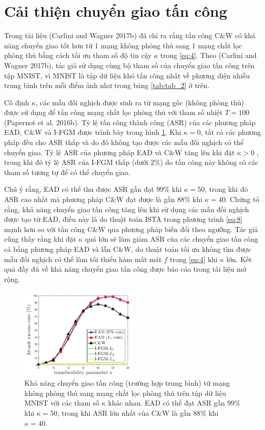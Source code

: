 \section{Cải thiện chuyển giao tấn công}
Trong tài liệu (Carlini and Wagner 2017b) đã chỉ ra rằng tấn công C\&W có khả năng chuyển giao tốt hơn  từ 1 mạng không phòng thủ sang 1 mạng chắt lọc phòng thủ bằng cách tối ưu tham số độ tin cậy $\kappa$ trong \ref{eq:4}. Theo (Carlini and Wagner 2017b), tác giả sử dụng cùng bộ tham số của chuyển giao tấn công trên tập MNIST, vì MNIST là tập dữ liệu khó tấn công nhất về phương diện nhiễu trung bình trên mỗi điểm ảnh như trong bảng \ref{tab:tab_2} ở trên.

Cố định $\kappa$, các mẫu đối nghịch được sinh ra từ mạng gốc (không phòng thủ) được sử dụng để tấn công mạng chắt lọc phòng thủ với tham số nhiệt $T = 100$ (Papernot et al. 2016b). Tỷ lệ tấn công thành công (ASR) của các phương pháp EAD, C\&W và I-FGM được trình bày trong hình \ref{fig:fg_04}. Khi $\kappa = 0$, tất cả các phương pháp đều cho ASR thấp và do đó không tạo được các mẫu đối nghịch có thể chuyển giao. Tỷ lệ ASR của phương pháp EAD và C\&W tăng lên khi đặt $\kappa > 0$ , trong khi đó tỷ lệ ASR của I-FGM thấp (dưới $2\%$) do tấn công này không có các tham số tương tự để có thể chuyển giao.

Chú ý rằng, EAD có thể thu được ASR gần đạt $99\%$ khi $\kappa = 50$, trong khi đó ASR cao nhất mà phương pháp C\&W đạt được là gần $88\%$ khi $\kappa = 40$. Chứng tỏ rằng, khả năng chuyển giao tấn công tăng lên khi sử dụng các mẫu đối nghịch được tạo từ EAD, điều này là do thuật toán ISTA trong phương trình \ref{eq:8} mạnh hơn so với tấn công C\&W qua phương pháp biến đổi theo ngưỡng. Tác giả cũng thấy rằng khi đặt $\kappa$ quá lớn sẽ làm giảm ASR của các chuyển giao tấn công cả bằng phương pháp EAD và lẫn C\&W, do thuật toán tối ưu không tìm được mẫu đối nghịch có thể làm tối thiểu hàm mất mát $f$ trong \ref{eq:4} khi $\kappa$ lớn. Kết quả đầy đủ về khả năng chuyển giao tấn công được báo cáo trong tài liệu mở rộng.

\begin{figure}[H] %
    \centering %
    \includegraphics[width=0.5\textwidth]{assets/fig_04.png} 
    \caption{Khả năng chuyển giao tấn công (trường hợp trung bình) từ mạng không phòng thủ sang mạng chắt lọc phòng thủ  trên tập dữ liệu MNIST với các tham số $\kappa$ khác nhau. EAD có thể đạt ASR gần $99\%$ khi $\kappa = 50$, trong khi ASR lớn nhất của C\&W là gần $88\%$ khi $\kappa=40$.} %
    \label{fig:fg_04}
\end{figure}
